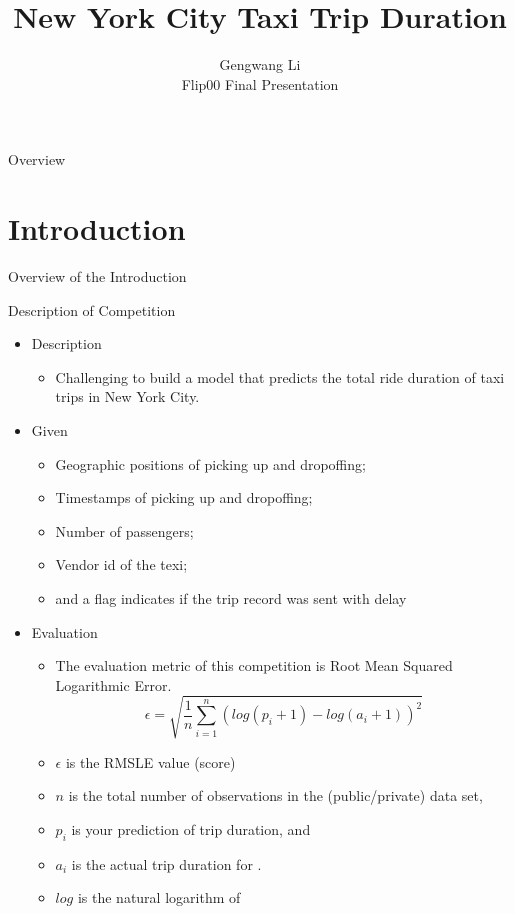 \documentclass[
 size=12pt,
 paper=smartboard, %
 mode=present, %
 display=slides, %
style=tuliplab,
pauseslide,
fleqn,leqno]{powerdot}
\title{New York City Taxi Trip Duration}
\author{
Gengwang Li
\\
Flip00 Final Presentation
}
\date{\gitCommitterDate}
\begin{document}
\maketitle 

\begin{slide}[toc=,bm=]{Overview}
\tableofcontents[content=sections]
\end{slide}

\section{Introduction}

\begin{slide}[toc=,bm=]{Overview of the Introduction}
\tableofcontents[content=currentsection,type=0]
\end{slide}

\begin{slide}{Description of Competition}
  \begin{itemize}
    \item Description \pause
    \begin{itemize}
      \item Challenging to build a model that predicts the total ride duration of taxi trips in New York City.
    \end{itemize} \pause
    \item Given \pause
    \begin{itemize}
      \item Geographic positions of picking up and dropoffing;
      \item Timestamps of picking up and dropoffing;
      \item Number of passengers;
      \item Vendor id of the texi;
      \item and a flag indicates if the trip record was sent with delay
    \end{itemize} \pause
    \item Evaluation \pause
    \begin{itemize}
      \item The evaluation metric of this competition is Root Mean Squared Logarithmic Error.
      $$
      \epsilon = \sqrt{\frac{1}{n} \sum_{i=1}^{n}{(log(p_i + 1) - log(a_i + 1))^2}}
      $$ 
      \pause
      \item $\epsilon$ is the RMSLE value (score)
      \item $n$ is the total number of observations in the (public/private) data set,
      \item $p_i$ is your prediction of trip duration, and
      \item $a_i$ is the actual trip duration for . 
      \item $log$ is the natural logarithm of 
    \end{itemize} 
  \end{itemize}
\end{slide}
\end{document}

